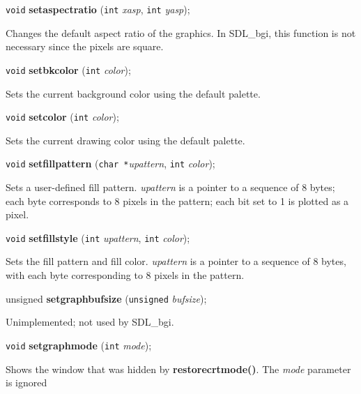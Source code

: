 \documentclass[a4paper,11pt]{article}
\newcommand{\SDLbgi}{SDL\_bgi}
\newcommand{\V}{\texttt{void}}      %
\newcommand{\I}{\texttt{int}}       %
\newcommand{\C}{\texttt{char *}}    %
\newcommand{\func}[1]{\textbf{#1}}  %
\newcommand{\A}[1]{\emph{#1}}       %
\newenvironment{bgi}
{ %
  \begin{snugshade}
}
{ %
  \end{snugshade}
}
\begin{document}
\begin{bgi}
\V{} \func{setaspectratio} (\I{} \A{xasp}, \I{} \A{yasp});
\end{bgi}

Changes the default aspect ratio of the graphics. In \SDLbgi, this
function is not necessary since the pixels are square.


\begin{bgi}
\V{} \func{setbkcolor} (\I{} \A{color});
\end{bgi}

Sets the current background color using the default palette.


\begin{bgi}
\V{} \func{setcolor} (\I{} \A{color});
\end{bgi}

Sets the current drawing color using the default palette.


\begin{bgi}
\V{} \func{setfillpattern} (\C{}\A{upattern}, \I{} \A{color}); 
\end{bgi}

Sets a user-defined fill pattern. \A{upattern} is a pointer to a
sequence of 8 bytes; each byte corresponds to 8 pixels in the pattern;
each bit set to 1 is plotted as a pixel.


\begin{bgi}
\V{} \func{setfillstyle} (\I{} \A{upattern}, \I{} \A{color}); 
\end{bgi}

Sets the fill pattern and fill color. \A{upattern} is a pointer to a
sequence of 8 bytes, with each byte corresponding to 8 pixels in the
pattern.


\begin{bgi}
unsigned \func{setgraphbufsize} (\texttt{unsigned} \A{bufsize}); 
\end{bgi}

Unimplemented; not used by \SDLbgi.


\begin{bgi}
\V{} \func{setgraphmode} (\I{} \A{mode}); 
\end{bgi}

Shows the window that was hidden by \func{restorecrtmode()}. The
\A{mode} parameter is ignored
\end{document}
